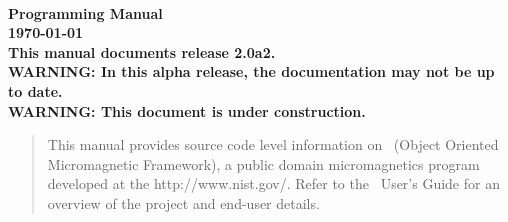 
\usepackage{l2hbugs}




\nocite{*}  %


\begin{titlepage}
\label{page:contents}
\par
\vspace*{\fill}
\begin{center}
\Large\bf
\OOMMF\\
Programming Manual\\[2ex]
\large
{\today}
{}\\[2ex]
This manual documents release 2.0a2.\\[1ex]
WARNING: In this alpha release, the
documentation may not be up to date.\\[1ex]
WARNING: This document is under construction.

\end{center}
\vspace{10\baselineskip}
\begin{abstract}
This manual provides source code level information on \OOMMF\ (Object Oriented Micromagnetic Framework),
a public domain micromagnetics program developed at the
{http://www.nist.gov/}.  Refer to the \OOMMF\ User's Guide for an
overview of the project and end-user details.
\end{abstract}
\vspace*{\fill}
\par
\end{titlepage}

\begin{latexonly}
\tableofcontents
\end{latexonly}


\newpage

\newpage







%
%






\printindex


